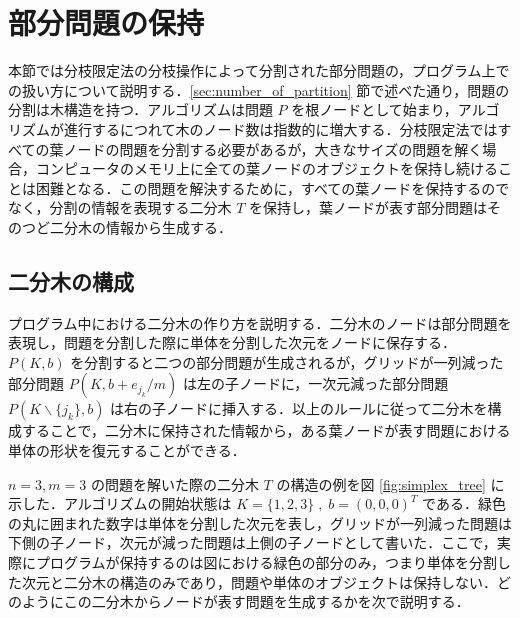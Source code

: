 \documentclass[a4paper,11pt]{jreport}
\begin{document}
\section{部分問題の保持}

本節では分枝限定法の分枝操作によって分割された部分問題の，プログラム上での扱い方について説明する．\ref{sec:number_of_partition} 節で述べた通り，問題の分割は木構造を持つ．アルゴリズムは問題 $ P $ を根ノードとして始まり，アルゴリズムが進行するにつれて木のノード数は指数的に増大する．分枝限定法ではすべての葉ノードの問題を分割する必要があるが，大きなサイズの問題を解く場合，コンピュータのメモリ上に全ての葉ノードのオブジェクトを保持し続けることは困難となる．この問題を解決するために，すべての葉ノードを保持するのでなく，分割の情報を表現する二分木 $ T $ を保持し，葉ノードが表す部分問題はそのつど二分木の情報から生成する．\par

\subsection{二分木の構成}

プログラム中における二分木の作り方を説明する．二分木のノードは部分問題を表現し，問題を分割した際に単体を分割した次元をノードに保存する．$ P(K, b) $ を分割すると二つの部分問題が生成されるが，グリッドが一列減った部分問題 $ P(K, b + e_{j_k} / m) $ は左の子ノードに，一次元減った部分問題 $ P(K \backslash \{ j_k \}, b) $ は右の子ノードに挿入する．以上のルールに従って二分木を構成することで，二分木に保持された情報から，ある葉ノードが表す問題における単体の形状を復元することができる．\par
$ n = 3, m = 3 $ の問題を解いた際の二分木 $ T $ の構造の例を図 \ref{fig:simplex_tree} に示した．アルゴリズムの開始状態は $ K = \{1, 2, 3\} \; , \; b = (0, 0, 0)^T $ である．緑色の丸に囲まれた数字は単体を分割した次元を表し，グリッドが一列減った問題は下側の子ノード，次元が減った問題は上側の子ノードとして書いた．ここで，実際にプログラムが保持するのは図における緑色の部分のみ，つまり単体を分割した次元と二分木の構造のみであり，問題や単体のオブジェクトは保持しない．どのようにこの二分木からノードが表す問題を生成するかを次で説明する．\par
\end{document}
